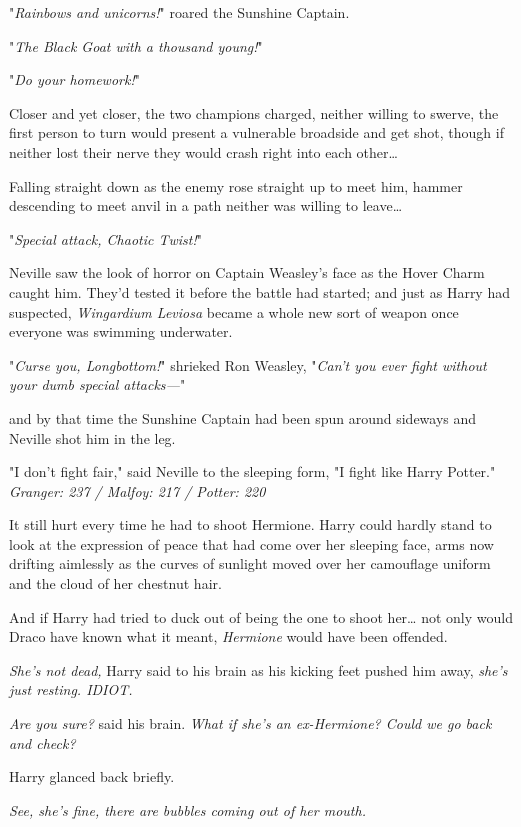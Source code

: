 "\emph{Rainbows and unicorns!}" roared the Sunshine Captain.

"\emph{The Black Goat with a thousand young!}"

"\emph{Do your homework!}"

Closer and yet closer, the two champions charged, neither willing to swerve, 
the first person to turn would present a vulnerable broadside and get shot, 
though if neither lost their nerve they would crash right into each 
other{\ldots}

Falling straight down as the enemy rose straight up to meet him, hammer 
descending to meet anvil in a path neither was willing to leave{\ldots}

"\emph{Special attack, Chaotic Twist!}"

Neville saw the look of horror on Captain Weasley's face as the Hover Charm 
caught him. They'd tested it before the battle had started; and just as Harry 
had suspected, \emph{Wingardium Leviosa} became a whole new sort of weapon once 
everyone was swimming underwater.

"\emph{Curse you, Longbottom!}" shrieked Ron Weasley, "\emph{Can't you ever 
fight without your dumb special attacks---}"

and by that time the Sunshine Captain had been spun around sideways and Neville 
shot him in the leg.

"I don't fight fair," said Neville to the sleeping form, "I fight like Harry 
Potter."
\sbreak
\emph{Granger: 237 / Malfoy: 217 / Potter: 220}

It still hurt every time he had to shoot Hermione. Harry could hardly stand to 
look at the expression of peace that had come over her sleeping face, arms now 
drifting aimlessly as the curves of sunlight moved over her camouflage uniform 
and the cloud of her chestnut hair.

And if Harry had tried to duck out of being the one to shoot her{\ldots} not 
only would Draco have known what it meant, \emph{Hermione} would have been 
offended.

\emph{She's not dead,} Harry said to his brain as his kicking feet pushed him 
away, \emph{she's just resting. IDIOT.}

\emph{Are you sure?} said his brain. \emph{What if she's an ex-Hermione? Could 
we go back and check?}

Harry glanced back briefly.

\emph{See, she's fine, there are bubbles coming out of her mouth.}

